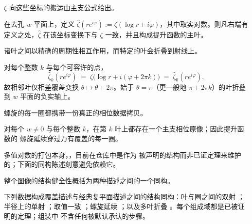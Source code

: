 $\zeta$ 向这些坐标的搬运由主支公式给出。

\begin{proposition}\label{prop:principal}
在去孔 $w$ 平面上，定义 $\widehat{\zeta}(re^{i\varphi})
:=\zeta(\log r+i\varphi)$，其中取实对数。则凡右端有定义之处，$\widehat{\zeta}$
在该坐标变换下与 $\zeta$ 一致，并且构成提升函数的主叶。
\end{proposition}

诸叶之间以精确的周期性相互作用，而特定的叶会折叠到射线上。

\begin{proposition}\label{prop:periodic}
对每个整数 $k$ 与每个可容许的点，
\[
  \widehat{\zeta}_{k}(re^{i\varphi})
  \;=\; \zeta\bigl(\log r+i(\varphi+2\pi k)\bigr)
  \;=\; \widehat{\zeta}_{0}(re^{i\varphi}),
\]
故相邻叶仅相差覆盖变换 $\theta\mapsto
\theta+2\pi$。始于 $\theta=\pi$（更一般地 $\pi+2\pi k$）的叶折叠到 $w$ 平面的负实轴上。
\end{proposition}

螺旋的每一圈都携带一份真正的相位数据拷贝。

\begin{theorem}\label{thm:branches}
对每个 $w\neq 0$ 与每个整数 $k$，在第 $k$ 叶上都存在一个主支相位原像；因此提升函数的
螺旋延续穿过万有覆盖的每一圈。
\end{theorem}

\begin{remark}
多值对数的打包本身，，目前在仓库中是作为
被声明的结构而非已证定理来维护的；下面的同构陈述刻意避免依赖它。
\end{remark}

整个图像的结构健全性概括为两种描述之间的一个同构。

\begin{theorem}
\label{thm:coveriso}
下列数据构成覆盖描述与经典复平面描述之间的结构同构：叶与圈之间的双射
；半径上的单射 ；取值一致 ；螺旋延续
；以及多叶折叠 。每个组成域都是已被证明的定理；组装中
不含任何被默认承认的步骤。
\end{theorem}

